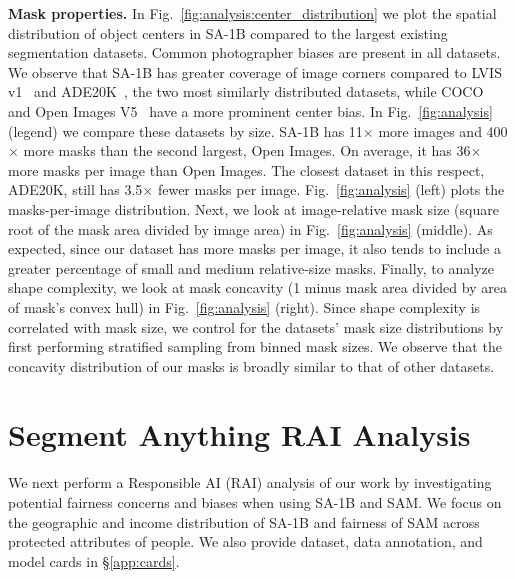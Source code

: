 \documentclass[10pt,twocolumn,letterpaper]{article}
\renewcommand{\paragraph}[1]{\vspace{1.25mm}\noindent\textbf{#1}}
\newcommand{\x}{{\times}}
\newcommand{\sad}{\mbox{SA-1B}\xspace}
\newcommand{\sam}{SAM\xspace}
\newcommand{\fig}[1]{Fig.~\ref{#1}}
\begin{document}
\paragraph{Mask properties.} In \fig{fig:analysis:center_distribution} we plot the spatial distribution of object centers in \sad compared to the largest existing segmentation datasets. Common photographer biases are present in all datasets. We observe that \sad has greater coverage of image corners compared to LVIS v1~\cite{Gupta2019} and ADE20K~\cite{Zhou2019}, the two most similarly distributed datasets, while COCO~\cite{Lin2014} and Open Images V5~\cite{OpenImages} have a more prominent center bias. In \fig{fig:analysis} (legend) we compare these datasets by size. \sad has 11$\x$ more images and 400$\x$ more masks than the second largest, Open Images. On average, it has 36$\x$ more masks per image than Open Images. The closest dataset in this respect, ADE20K, still has 3.5$\x$ fewer masks per image. \fig{fig:analysis} (left) plots the masks-per-image distribution. Next, we look at image-relative mask size (square root of the mask area divided by image area) in \fig{fig:analysis} (middle). As expected, since our dataset has more masks per image, it also tends to include a greater percentage of small and medium relative-size masks. Finally, to analyze shape complexity, we look at mask concavity (1 minus mask area divided by area of mask's convex hull) in \fig{fig:analysis} (right). Since shape complexity is correlated with mask size, we control for the datasets' mask size distributions by first performing stratified sampling from binned mask sizes. We observe that the concavity distribution of our masks is broadly similar to that of other datasets.

\section{Segment Anything RAI Analysis}\label{sec:rai}

We next perform a Responsible AI (RAI) analysis of our work by investigating potential fairness concerns and biases when using \sad and \sam. We focus on the geographic and income distribution of \sad and fairness of \sam across protected attributes of people. We also provide dataset, data annotation, and model cards in \S\ref{app:cards}.
\end{document}
